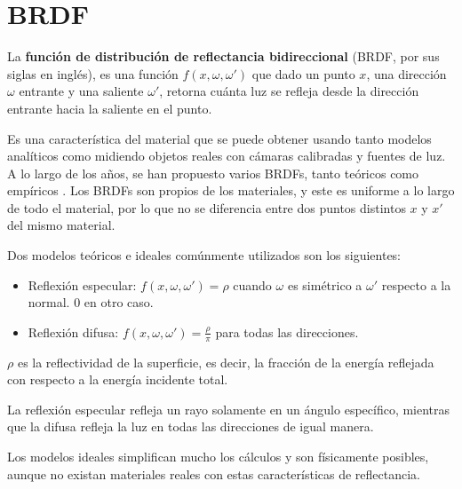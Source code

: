 
\section{BRDF}\label{sec:brdf}

La \textbf{función de distribución de reflectancia bidireccional} (BRDF, por sus siglas en inglés), es una función $f(x, \omega, \omega')$ que dado un punto $x$, una dirección $\omega$ entrante y una saliente $\omega'$, retorna cuánta luz se refleja desde la dirección entrante hacia la saliente en el punto.

Es una característica del material que se puede obtener usando tanto modelos analíticos como midiendo objetos reales con cámaras calibradas y fuentes de luz.
A lo largo de los años, se han propuesto varios BRDFs, tanto teóricos como empíricos \cite{review-of-brdf-models}.
Los BRDFs son propios de los materiales, y este es uniforme a lo largo de todo el material, por lo que no se diferencia entre dos puntos distintos $x$ y $x'$ del mismo material.


Dos modelos teóricos e ideales comúnmente utilizados son los siguientes:

\begin{itemize}
    \item Reflexión especular: $f(x, \omega, \omega') = \rho$ cuando $\omega$ es simétrico a $\omega'$ respecto a la normal. $0$ en otro caso.
    \item Reflexión difusa: $f(x, \omega, \omega') = \frac{\rho}{\pi}$ para todas las direcciones.
\end{itemize}

$\rho$ es la reflectividad de la superficie, es decir, la fracción de la energía reflejada con respecto a la energía incidente total.

La reflexión especular refleja un rayo solamente en un ángulo específico,
mientras que la difusa refleja la luz en todas las direcciones de igual manera.

Los modelos ideales simplifican mucho los cálculos y son físicamente posibles, aunque no existan materiales reales con estas características de reflectancia.

